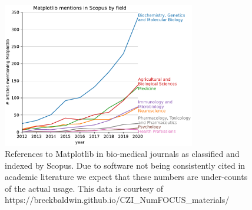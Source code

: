 \documentclass{article}
\begin{document}
\begin{figure}
  \begin{center}
    \includegraphics[width=0.75\textwidth]{scopus_mentions.pdf}
  \end{center}
  \caption{References to Matplotlib in bio-medical journals as
    classified and indexed by Scopus.  Due to software not being consistently
    cited in academic literature we expect that these numbers are under-counts
    of the actual usage.  This data is courtesy of
    https://breckbaldwin.github.io/CZI\_NumFOCUS\_materials/ }
\end{figure}
\end{document}
